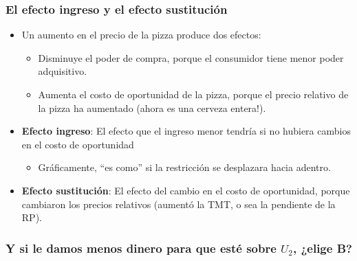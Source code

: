 \documentclass{beamer}
\begin{document}
\begin{frame}
\frametitle{El efecto ingreso y el efecto sustitución}
\begin{itemize}
    \item Un aumento en el precio de la pizza produce dos efectos:
    \begin{itemize}
        \item Disminuye el poder de compra, porque el consumidor tiene menor poder adquisitivo.
        \item Aumenta el costo de oportunidad de la pizza, porque el precio relativo de la pizza ha aumentado (ahora es una cerveza entera!).
    \end{itemize}
    \item \textbf{Efecto ingreso}: El efecto que el ingreso menor tendría si no hubiera cambios en el costo de oportunidad
    \begin{itemize}
        \item Gráficamente, ``es como'' si la restricción se desplazara hacia adentro.
    \end{itemize}
    
    \item \textbf{Efecto sustitución}: El efecto del cambio en el costo de oportunidad, porque cambiaron los precios relativos (aumentó la TMT, o sea la pendiente de la RP).
\end{itemize} 
\end{frame}

\begin{frame}
\frametitle{Y si le damos menos dinero para que esté sobre $U_2$, ¿elige B?}
\begin{center}
\begin{figure}[H]
\renewcommand{\figurename}{Figure}
\begin{center}
\end{center}

\end{figure}
\end{center}
\end{frame}
\end{document}
